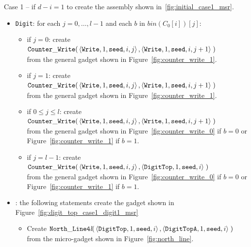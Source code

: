 Case 1 -- if $d - i = 1$ to create the assembly shown in~\ref{fig:initial_case1_msr}.
\begin{itemize}
    \item {\tt Digit}: for each $j=0,\ldots,l-1$ and each $b$ in $bin(C_0[i])[j]$:
    \begin{itemize}
        \item if $j = 0$: create
        $\begin{aligned}[t]
            {\tt Counter\_Write}(&\left\langle {\tt Write}, 1, {\tt seed}, i, j \right\rangle, \left\langle {\tt Write}, 1, {\tt seed}, i, j + 1 \right\rangle \;)
        \end{aligned}$\\from the general gadget shown in Figure~\ref{fig:counter_write_1}.

        \item if $j = 1$: create
        $\begin{aligned}[t]
            {\tt Counter\_Write}(&\left\langle {\tt Write}, 1, {\tt seed}, i, j \right\rangle, \left\langle {\tt Write}, 1, {\tt seed}, i, j + 1 \right\rangle \;)
        \end{aligned}$\\from the general gadget shown in Figure~\ref{fig:counter_write_1}.

        \item if $0 \leqslant j \leqslant l$: create
        $\begin{aligned}[t]
            {\tt Counter\_Write}(&\left\langle {\tt Write}, 1, {\tt seed}, i, j \right\rangle, \left\langle {\tt Write}, 1, {\tt seed}, i, j + 1 \right\rangle \;)
        \end{aligned}$\\from the general gadget shown in Figure~\ref{fig:counter_write_0} if $b = 0$ or Figure~\ref{fig:counter_write_1} if $b = 1$.

        \item if $j = l-1$: create
        $\begin{aligned}[t]
            {\tt Counter\_Write}(&\left\langle {\tt Write}, 1, {\tt seed}, i, j \right\rangle, \left\langle {\tt DigitTop}, 1, {\tt seed}, i \right\rangle \;)
        \end{aligned}$\\from the general gadget shown in Figure~\ref{fig:counter_write_0} if $b = 0$ or Figure~\ref{fig:counter_write_1} if $b = 1$.
    \end{itemize}

    \item {\dtop}: the following statements create the gadget shown in Figure~\ref{fig:digit_top_case1_digit1_msr}
    \begin{itemize}
        \item Create
        $\begin{aligned}[t]
            {\tt North\_Line4\textit{l}}(& \left\langle {\tt DigitTop},  1, {\tt seed}, i \right\rangle,
                                           \left\langle {\tt DigitTopA}, 1, {\tt seed}, i \right\rangle \;)
        \end{aligned}$\\from the micro-gadget shown in Figure~\ref{fig:north_line}.


\end{itemize}
\end{itemize}

